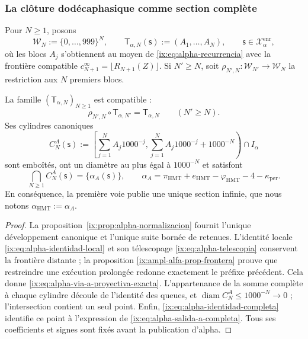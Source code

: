 \subsubsection{La clôture dodécaphasique comme section complète}

Pour \(N\geq1\), posons
\[
 \mathcal W_N:=\{0,\ldots,999\}^{N},
 \qquad
 \mathsf T_{\alpha,N}(\mathsf s):=(A_1,\ldots,A_N),
 \qquad \mathsf s\in\mathcal X_{\alpha}^{\mathrm{enr}},
\]
où les blocs \(A_j\) s'obtiennent au moyen de
\eqref{ix:eq:alpha-recurrencia} avec la frontière compatible
\(c_{N+1}^{\infty}=\lfloor R_{N+1}(Z)\rfloor\). Si \(N'\geq N\), soit
\(\rho_{N',N}:\mathcal W_{N'}\to\mathcal W_N\) la restriction aux
\(N\) premiers blocs.

\begin{theorem}
\label{ix:thm:alpha-salida-dodecafasica-completa}
La famille \((\mathsf T_{\alpha,N})_{N\geq1}\) est compatible :
\begin{equation}
 \rho_{N',N}\circ\mathsf T_{\alpha,N'}
 =\mathsf T_{\alpha,N}
 \qquad(N'\geq N).
 \label{ix:eq:alpha-via-a-proyectiva-exacta}
\end{equation}
Ses cylindres canoniques
\begin{equation}
 C_N^A(\mathsf s):=
 \left[
  \sum_{j=1}^{N}A_j1000^{-j},
  \sum_{j=1}^{N}A_j1000^{-j}+1000^{-N}
 \right)\cap I_\alpha
 \label{ix:eq:alpha-cilindros-via-a-exactos}
\end{equation}
sont emboîtés, ont un diamètre au plus égal à \(1000^{-N}\) et satisfont
\begin{equation}
 \bigcap_{N\geq1}C_N^A(\mathsf s)
 =\{\alpha_A(\mathsf s)\},
 \qquad
 \alpha_A
 =\pi_{\mathrm{HMT}}+e_{\mathrm{HMT}}-\varphi_{\mathrm{HMT}}
  -4-\kappa_{\mathrm{per}}.
 \label{ix:eq:alpha-salida-a-completa}
\end{equation}
En conséquence, la première voie publie une unique section infinie, que
nous notons \(\alpha_{\mathrm{HMT}}:=\alpha_A\).
\end{theorem}

\begin{proof}
La proposition~\ref{ix:prop:alpha-normalizacion} fournit l'unique développement canonique et l'unique suite bornée de retenues. L'identité locale \eqref{ix:eq:alpha-identidad-local} et son télescopage \eqref{ix:eq:alpha-telescopia} conservent la frontière distante ; la proposition \ref{ix:ampl-alfa-prop-frontera} prouve que restreindre une exécution prolongée redonne exactement le préfixe précédent. Cela donne \eqref{ix:eq:alpha-via-a-proyectiva-exacta}. L'appartenance de la somme complète à chaque cylindre découle de l'identité des queues, et \(\operatorname{diam}C_N^A\leq1000^{-N}\to0\) ; l'intersection contient un seul point. Enfin, \eqref{ix:eq:alpha-identidad-completa} identifie ce point à l'expression de \eqref{ix:eq:alpha-salida-a-completa}. Tous ses coefficients et signes sont fixés avant la publication d'alpha.
\end{proof}

